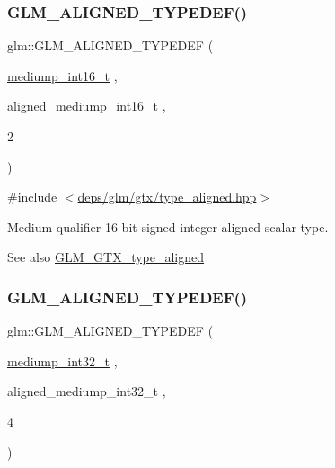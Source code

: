 \subsubsection{\texorpdfstring{G\+L\+M\+\_\+\+A\+L\+I\+G\+N\+E\+D\+\_\+\+T\+Y\+P\+E\+D\+E\+F()}{GLM\_ALIGNED\_TYPEDEF()}\hspace{0.1cm}{\footnotesize\ttfamily [18/209]}}
{\footnotesize\ttfamily glm\+::\+G\+L\+M\+\_\+\+A\+L\+I\+G\+N\+E\+D\+\_\+\+T\+Y\+P\+E\+D\+EF (\begin{DoxyParamCaption}\item[{\hyperlink{group__gtc__type__precision_ga478fab608cf43040013d719a3e03b194}{mediump\+\_\+int16\+\_\+t}}]{,  }\item[{aligned\+\_\+mediump\+\_\+int16\+\_\+t}]{,  }\item[{2}]{ }\end{DoxyParamCaption})}



{\ttfamily \#include $<$\hyperlink{gtx_2type__aligned_8hpp}{deps/glm/gtx/type\+\_\+aligned.\+hpp}$>$}

Medium qualifier 16 bit signed integer aligned scalar type. \begin{DoxySeeAlso}{See also}
\hyperlink{group__gtx__type__aligned}{G\+L\+M\+\_\+\+G\+T\+X\+\_\+type\+\_\+aligned} 
\end{DoxySeeAlso}
\mbox{\label{group__gtx__type__aligned_ga1284488189daf897cf095c5eefad9744}} 
\subsubsection{\texorpdfstring{G\+L\+M\+\_\+\+A\+L\+I\+G\+N\+E\+D\+\_\+\+T\+Y\+P\+E\+D\+E\+F()}{GLM\_ALIGNED\_TYPEDEF()}\hspace{0.1cm}{\footnotesize\ttfamily [19/209]}}
{\footnotesize\ttfamily glm\+::\+G\+L\+M\+\_\+\+A\+L\+I\+G\+N\+E\+D\+\_\+\+T\+Y\+P\+E\+D\+EF (\begin{DoxyParamCaption}\item[{\hyperlink{group__gtc__type__precision_gafd9b4bd9e4465aec63351b59100692c4}{mediump\+\_\+int32\+\_\+t}}]{,  }\item[{aligned\+\_\+mediump\+\_\+int32\+\_\+t}]{,  }\item[{4}]{ }\end{DoxyParamCaption})}



